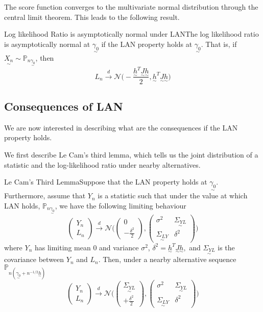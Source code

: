 \documentclass[twoside]{article}
\newcommand{\prob}{\mathbb{P}}
\newcommand{\utilde}{\underset{\sim}}
\begin{document}
The score function converges to the multivariate normal distribution through the central limit theorem. This leads to the following result.

\begin{proposition_exam}{Log likelihood Ratio is asymptotically normal under LAN}{}The log likelihood ratio is asymptotically normal at $\utilde{\gamma_0}$ if the LAN property holds at $\utilde{\gamma_0}.$ That is, if $\utilde{X_n} \sim \prob_{n \utilde{\gamma_0}}$, then
$$
L_n \xrightarrow{d} \mathcal{N}\bigg(-\frac{\utilde{h}^T\utilde{J}\utilde{h}}{2},\utilde{h}^T\utilde{J}\utilde{h} \bigg)
$$
\end{proposition_exam}

\subsection{Consequences of LAN}

We are now interested in describing what are the consequences if the LAN property holds.

We first describe Le Cam's third lemma, which tells us the joint distribution of a statistic and the log-likelihood ratio under nearby alternatives. 


\begin{theorem_exam}{Le Cam's Third Lemma}{}Suppose that the LAN property holds at $\utilde{\gamma_0}$. Furthermore, assume that $Y_n$ is a statistic such that under the value at which LAN holds, $\prob_{n\utilde{\gamma_0}}$, we have the following limiting behaviour 
\begin{equation}
\begin{pmatrix}
Y_n\\
L_n
\end{pmatrix}
 \xrightarrow{d} \mathcal{N}
\bigg( 
\begin{pmatrix}
0 \\
-\frac{\delta^2}{2}
\end{pmatrix}
,
\begin{pmatrix}
\sigma^2 & \utilde{\Sigma_{YL}} \\
\utilde{\Sigma_{LY}} & \delta^2
\end{pmatrix}
\bigg)
\end{equation}
where $Y_n$ has limiting mean $0$ and variance $\sigma^2$, $\delta^2 = \utilde{h}^T\utilde{J}\utilde{h},$ and $\utilde{\Sigma_{YL}}$ is the covariance between $Y_n$ and $L_n.$ Then, under a nearby alternative sequence $\prob_{n(\utilde{\gamma_0} + n^{-1/2}\utilde{h})}$
\begin{equation}
\begin{pmatrix}
Y_n\\
L_n
\end{pmatrix}
 \xrightarrow{d} \mathcal{N}
\bigg( 
\begin{pmatrix}
\utilde{\Sigma_{YL}} \\
+\frac{\delta^2}{2}
\end{pmatrix}
,
\begin{pmatrix}
\sigma^2 & \utilde{\Sigma_{YL}} \\
\utilde{\Sigma_{LY}} & \delta^2
\end{pmatrix}
\bigg)
\end{equation}
\end{theorem_exam}
\end{document}
